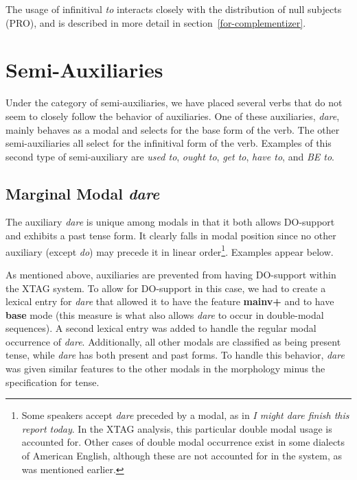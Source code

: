
The usage of infinitival {\em to} interacts closely with the distribution of
null subjects (PRO), and is described in more detail in
section~\ref{for-complementizer}.

\section{Semi-Auxiliaries}

Under the category of semi-auxiliaries, we have placed several verbs that do
not seem to closely follow the behavior of auxiliaries.  One of these 
auxiliaries, {\it dare}, mainly behaves as a modal and selects for the base 
form of the verb.  The other semi-auxiliaries all select for the infinitival 
form of the verb.  Examples of this second type of semi-auxiliary are {\it 
used to}, {\it ought to}, {\it get to}, {\it have to}, and {\it BE to}.  

\subsection{Marginal Modal {\it dare}}

The auxiliary {\it dare} is unique among modals in that it both allows
DO-support and exhibits a past tense form.  It clearly falls in modal position
since no other auxiliary (except {\it do}) may precede it in linear
order\footnote{Some speakers accept {\it dare} preceded by a modal, as in {\it
I might dare finish this report today}.  In the XTAG analysis, this particular
double modal usage is accounted for.  Other cases of double modal occurrence
exist in some dialects of American English,  although these are not accounted
for in the system, as was mentioned earlier.\label{dare-footnote}}.  Examples appear below.


As mentioned above, auxiliaries are prevented from having DO-support within the
XTAG system.  To allow for DO-support in this case, we had to create a lexical
entry for {\it dare} that allowed it to have the feature {\bf
mainv+} and to have {\bf base} mode (this measure is
what also allows {\it dare} to occur in double-modal sequences).  A second
lexical entry was added to handle the regular modal occurrence of {\it dare}.
Additionally, all other modals are classified as being present tense, while
{\it dare} has both present and past forms.  To handle this behavior, {\it
dare} was given similar features to the other modals in the morphology minus
the specification for tense. 

